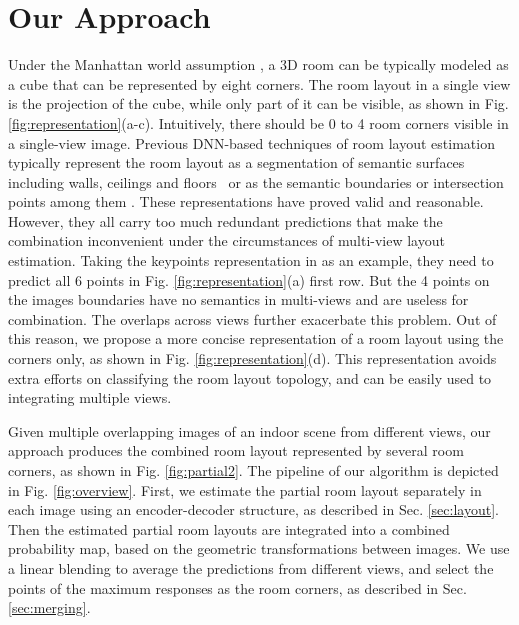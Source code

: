 \section{Our Approach}


Under the Manhattan world assumption \cite{coughlan1999manhattan}, a 3D room can be typically modeled as a cube that can be represented by eight corners.
The room layout in a single view is the projection of the cube, while only part of it can be visible, as shown in Fig. \ref{fig:representation}(a-c). 
Intuitively, there should be 0 to 4 room corners visible in a single-view image. 
%
Previous DNN-based techniques of room layout estimation typically represent the room layout as a segmentation of semantic surfaces including walls, ceilings and floors~\cite{dasgupta2016delay} or as the semantic boundaries or intersection points among them \cite{ren2016coarse,zhao2017physics,LeeRoomNet17}. 
%
These representations have proved valid and reasonable. 
However, they all carry too much redundant predictions that make the combination inconvenient under the circumstances of multi-view layout estimation. Taking the keypoints representation in \cite{LeeRoomNet17} as an example, they need to predict all 6 points in Fig. \ref{fig:representation}(a) first row. But the 4 points on the images boundaries have no semantics in multi-views and are useless for combination. The overlaps across views further exacerbate this problem. Out of this reason, we propose a more concise representation of a room layout using the corners only, as shown in Fig. \ref{fig:representation}(d). 
This representation avoids extra efforts on classifying the room layout topology, and can be easily used to integrating multiple views.
%


%

Given multiple overlapping images of an indoor scene from different views, our approach produces the combined room layout represented by several room corners, as shown in Fig. \ref{fig:partial2}. The pipeline of our algorithm is depicted in Fig. \ref{fig:overview}. 
%
First, we estimate the partial room layout separately in each image using an encoder-decoder structure, as described in Sec. \ref{sec:layout}. 
Then the estimated partial room layouts are integrated into a combined probability map, based on the geometric transformations between images. 
We use a linear blending to average the predictions from different views, and select the points of the maximum responses as the room corners, as described in Sec. \ref{sec:merging}. 

